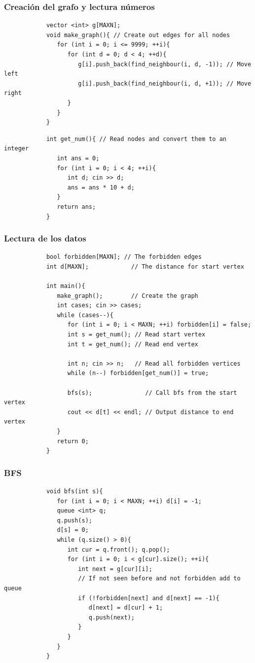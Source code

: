 \documentclass{beamer}
\begin{document}
	\begin{frame}[fragile]
		\frametitle{Creación del grafo y lectura números}
		\begin{lstlisting}
			vector <int> g[MAXN];
			void make_graph(){ // Create out edges for all nodes
			   for (int i = 0; i <= 9999; ++i){
			      for (int d = 0; d < 4; ++d){
			         g[i].push_back(find_neighbour(i, d, -1)); // Move left
			         g[i].push_back(find_neighbour(i, d, +1)); // Move right
			      }
			   }
			}
		\end{lstlisting}
		
		\begin{lstlisting}
			int get_num(){ // Read nodes and convert them to an integer
			   int ans = 0;
			   for (int i = 0; i < 4; ++i){
			      int d; cin >> d;
			      ans = ans * 10 + d;
			   }
			   return ans;
			}
		\end{lstlisting}
	\end{frame}
	
	\begin{frame}[fragile]
		\frametitle{Lectura de los datos}
		\begin{lstlisting}
			bool forbidden[MAXN]; // The forbidden edges
			int d[MAXN];            // The distance for start vertex

			int main(){
			   make_graph();        // Create the graph
			   int cases; cin >> cases;
			   while (cases--){
			      for (int i = 0; i < MAXN; ++i) forbidden[i] = false;
			      int s = get_num(); // Read start vertex
			      int t = get_num(); // Read end vertex

			      int n; cin >> n;   // Read all forbidden vertices
			      while (n--) forbidden[get_num()] = true;
		
			      bfs(s);               // Call bfs from the start vertex
			      cout << d[t] << endl; // Output distance to end vertex
			   }
			   return 0;
			}
		\end{lstlisting}
	\end{frame}
	
	\begin{frame}[fragile]
		\frametitle{BFS}
		\begin{lstlisting}
			void bfs(int s){
			   for (int i = 0; i < MAXN; ++i) d[i] = -1;
			   queue <int> q;
			   q.push(s);
			   d[s] = 0;
			   while (q.size() > 0){
			      int cur = q.front(); q.pop();
			      for (int i = 0; i < g[cur].size(); ++i){
			         int next = g[cur][i];
			         // If not seen before and not forbidden add to queue
			         if (!forbidden[next] and d[next] == -1){ 
			            d[next] = d[cur] + 1;
			            q.push(next);
			         }
			      }
			   }
			}
		\end{lstlisting}
	\end{frame}
\end{document}
